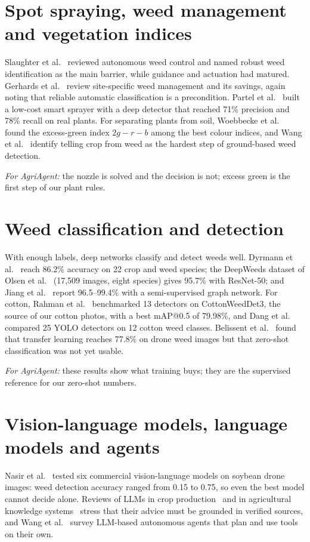 \section{Spot spraying, weed management and vegetation indices}\label{sec:lit-spraying}
Slaughter et al.~\cite{slaughter2008review} reviewed autonomous weed control and named robust weed
identification as the main barrier, while guidance and actuation had matured. Gerhards et
al.~\cite{gerhards2022sswm} review site-specific weed management and its savings, again noting that
reliable automatic classification is a precondition. Partel et al.~\cite{partel2019sprayer} built a
low-cost smart sprayer with a deep detector that reached 71\% precision and 78\% recall on real plants.
For separating plants from soil, Woebbecke et al.~\cite{woebbecke1995color} found the excess-green index
$2g-r-b$ among the best colour indices, and Wang et al.~\cite{wang2019review} identify telling crop from
weed as the hardest step of ground-based weed detection.

\textit{For AgriAgent:} the nozzle is solved and the decision is not; excess green is the first step of
our plant rules.

\section{Weed classification and detection}\label{sec:lit-detection}
With enough labels, deep networks classify and detect weeds well. Dyrmann et
al.~\cite{dyrmann2016species} reach 86.2\% accuracy on 22 crop and weed species; the DeepWeeds dataset of
Olsen et al.~\cite{olsen2019deepweeds} (17,509 images, eight species) gives 95.7\% with ResNet-50; and
Jiang et al.~\cite{jiang2020gcn} report 96.5--99.4\% with a semi-supervised graph network. For cotton,
Rahman et al.~\cite{rahman2023cotton} benchmarked 13 detectors on CottonWeedDet3, the source of our
cotton photos, with a best mAP@0.5 of 79.98\%, and Dang et al.~\cite{dang2023yoloweeds} compared 25 YOLO
detectors on 12 cotton weed classes. Belissent et al.~\cite{belissent2024transfer} found that transfer
learning reaches 77.8\% on drone weed images but that zero-shot classification was not yet usable.

\textit{For AgriAgent:} these results show what training buys; they are the supervised reference for our
zero-shot numbers.

\section{Vision-language models, language models and agents}\label{sec:lit-vlm}
Nasir et al.~\cite{nasir2026vlmweed} tested six commercial vision-language models on soybean drone
images: weed detection accuracy ranged from 0.15 to 0.75, so even the best model cannot decide alone.
Reviews of LLMs in crop production~\cite{kuska2024llm} and in agricultural knowledge
systems~\cite{li2025llmagri} stress that their advice must be grounded in verified sources, and Wang et
al.~\cite{wang2024agents} survey LLM-based autonomous agents that plan and use tools on their own.

